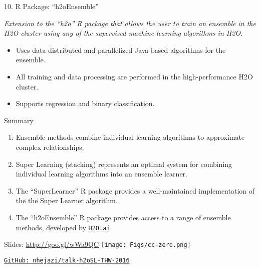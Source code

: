 \documentclass[12pt,t]{beamer}
\begin{document}
\begin{frame}{10. R Package: ``h2oEnsemble''}

\vspace*{3mm}

\centering

\textit{Extension to the ``h2o'' R package that allows the user to train an
ensemble in the H2O cluster using any of the supervised machine learning
algorithms in H2O.}

\vspace{1em}

  \begin{itemize}
    \itemsep12pt
    \item Uses data-distributed and parallelized Java-based algorithms for the
          ensemble.
    \item All training and data processing are performed in the
          high-performance H2O cluster.
    \item Supports regression and binary classification.
  \end{itemize}

\note{
}
\end{frame}


\begin{frame}[c]{Summary}

  \begin{enumerate}
  \itemsep12pt
    \item Ensemble methods combine individual learning algorithms to approximate
          complex relationships.
    \item Super Learning (stacking) represents an optimal system for combining
          individual learning algorithms into an ensemble learner.
    \item The ``SuperLearner'' R package provides a well-maintained
          implementation of the the Super Learner algorithm.
    \item The ``h2oEnsemble'' R package provides access to a range of ensemble
          methods, developed by \href{http://www.h2o.ai}{\tt H2O.ai}.
  \end{enumerate}

\end{frame}


\begin{frame}[c]{}

\Large

Slides: \url{http://goo.gl/wWa9QC} \quad
\texttt{[image: Figs/cc-zero.png]}

\vspace{10mm}

\href{https://github.com/nhejazi/talk-h2oSL-THW-2016}
{\tt GitHub: nhejazi/talk-h2oSL-THW-2016}

\end{frame}
\end{document}
